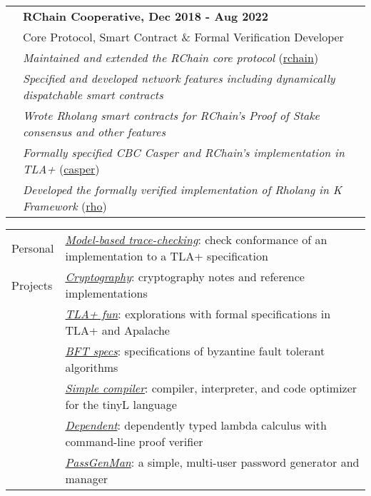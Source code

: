 \documentclass[letterpaper,10pt,oneside]{article}
\begin{document}
\vfill


\noindent \begin{tabular}{@{} l l}
 \hspace{1.1in} & \textbf{RChain Cooperative, Dec 2018 - Aug 2022} \\
 & Core Protocol, Smart Contract \& Formal Verification Developer \\
 & \emph{Maintained and extended the RChain core protocol} (\href{https://github.com/rchain/rchain}{rchain}) \\
 & \emph{Specified and developed network features including dynamically dispatchable smart contracts} \\
 & \emph{Wrote Rholang smart contracts for RChain's Proof of Stake consensus and other features} \\
 & \emph{Formally specified CBC Casper and RChain's implementation in TLA+} (\href{https://github.com/Isaac-DeFrain/TLAplus/tree/master/Casper}{casper}) \\
 & \emph{Developed the formally verified implementation of Rholang in K Framework} (\href{https://github.com/Isaac-DeFrain/KFramework/tree/master/Languages/GroundedRho}{rho}) \\
\end{tabular}

\vfill


\noindent \begin{tabular}{@{} l l}
 \Large{Personal} & \href{https://github.com/Isaac-DeFrain/model-based-trace-checking}{\emph{Model-based trace-checking}}: check conformance of an implementation to a TLA+ specification \\
 \Large{Projects} & \href{https://github.com/Isaac-DeFrain/cryptography}{\emph{Cryptography}}: cryptography notes and reference implementations \\
 \hspace{1.1in}  & \href{https://github.com/Isaac-DeFrain/TLAplusFun}{\emph{TLA+ fun}}: explorations with formal specifications in TLA+ and Apalache \\
 & \href{https://github.com/Isaac-DeFrain/bft_specs}{\emph{BFT specs}}: specifications of byzantine fault tolerant algorithms \\
 & \href{https://github.com/Isaac-DeFrain/simple-compiler}{\emph{Simple compiler}}: compiler, interpreter, and code optimizer for the tinyL language \\
 & \href{https://github.com/Isaac-DeFrain/dependent}{\emph{Dependent}}: dependently typed lambda calculus with command-line proof verifier \\
 & \href{https://github.com/Isaac-DeFrain/PassGenMan}{\emph{PassGenMan}}: a simple, multi-user password generator and manager \\
\end{tabular}
\end{document}
